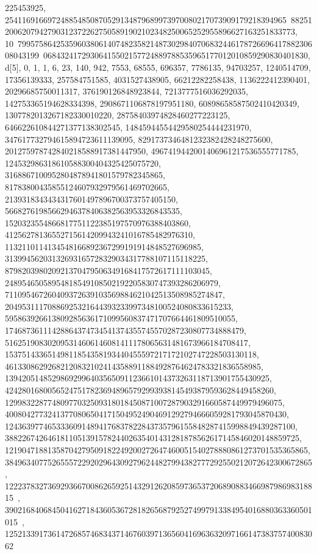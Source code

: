 {{{225453925, 254116916697248854850870529134879689973970080217073909179218394965\
8825120062079427903123722627505891902102348250065252955896627163251833773, 10\
79957586425359603806140748235821487302984070683244617872669641788230608043199\
06843241729306415502157724889788535965177012010859290830401830}}, 
 {d[5], {0, 1, 1, 6, 23, 140, 942, 7553, 68555, 696357, 7786135, 94703257, 
   1240514709, 17356139333, 257584751585, 4031527438905, 66212282258438, 
   1136222412390401, 20296685750011317, 376190126848923844, 
   7213777516036292035, 142753365194628334398, 2908671106878197951180, 
   60898658587502410420349, 1307782013267182330010220, 
   28758403974828460277223125, 646622610844271377138302545, 
   14845944554429580254444231970, 347617732794615894723611139095, 
   8291737346481232382428248275600, 201275978742840218588917381447950, 
   4967419442001406961217536555771785, 124532986318610588300404325425075720, 
   3168867100952804878941801579782345865, 
   81783800435855124607932979561469702665, 
   2139318343434317601497896700373757405150, 
   56682761985662946378406382563953326843535, 
   1520323554866817751122385197570976388403860, 
   41256278136552715614209943241016785482976310, 
   1132110114134548166892367299191914848527696985, 
   31399456203132693165728329034317788107115118225, 
   879820398020921370479506349168417572617111103045, 
   24895465058954818549108502192205830747393286206979, 
   711095467260409372639103569884621042513508985274847, 
   20495311170886925321644393233997348100524080833615233, 
   595863926613809285636171099560837471707664461809510055, 
   17468736111428864374734541374355745570287230807734888479, 
   516251908302095314606146081411178065631481673966184708417, 
   15375143365149811854358193440455597217172102747228503130118, 
   461330862926821208321024143588911884928764624783321836558985, 
   13942051485298692996403565091123661014373263118713901755430925, 
   424280168005652475178236948965792993938145493879593628449458260, 
   12998322877480977032509318018450871007287903291660587449979496075, 
   400804277324137708065041715049524904691292794666059281793045870430, 
   12436397746533360914894176837822843735796155848287415998849439287100, 
   388226742646181105139157824402635401431281878562617145846020148859725, 
   12190471881358704279509182249200272647460051540278880861273701535365865, 
   384963407752655572292029643092796244827994382777292550212072642300672865, 
   12223783273692936670086265925143291262085973653720689088346698798698318815\
, 
   390216840684504162718436053672818265687925274997913384954016880363360501015\
, 
   12521339173614726857468343714676039713656041696363209716614738375740083062\
}}}
